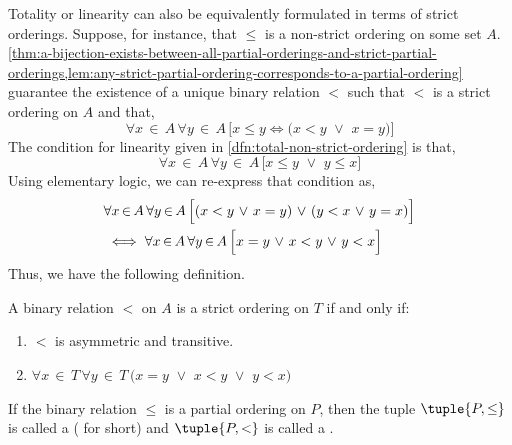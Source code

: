 \vspace{0.3cm}
\noindent
Totality or linearity can also be equivalently formulated in terms of strict orderings.
Suppose, for instance, that \( \leq \) is a non-strict ordering on some set \( A \).
\cref{thm:a-bijection-exists-between-all-partial-orderings-and-strict-partial-orderings,lem:any-strict-partial-ordering-corresponds-to-a-partial-ordering}
guarantee the existence of a unique binary relation \( < \) such that \( < \) is a strict ordering on \( A \) and that,
\begin{equation*}
    \forall x\,{\in}\,A \, \forall y\,{\in}\,A \, \Big[ x \leq y \iff \big( x < y \,\,{\lor}\,\, x = y \big) \Big]
\end{equation*}
The condition for linearity given in \cref{dfn:total-non-strict-ordering} is that,
\begin{equation*}
    \forall x\,{\in}\,A \, \forall y\,{\in}\,A \, \Big[ x \leq y \,\,{\lor}\,\, y \leq x \Big]
\end{equation*}
Using elementary logic, we can re-express that condition as,
\begin{align*}
    &\forall x\,{\in}\,A \, \forall y\,{\in}\,A \, \Big[ \mleft( x < y \,\,{\lor}\,\, x = y \mright) \,\,{\lor}\,\, \mleft( y < x \,\,{\lor}\,\, y = x \mright) \Big]\\
    &\iff
    \forall x\,{\in}\,A \, \forall y\,{\in}\,A \, \Big[ x = y \,\,{\lor}\,\, x < y \,\,{\lor}\,\, y < x \Big]
\end{align*}
Thus, we have the following definition.

\begin{dfn}
    \label{dfn:total-strict-ordering}
    A binary relation \( < \) on \( A \) is a  strict ordering on \( T \) if and only if:
    \begin{enumerate}[topsep=2pt,label=\texttt{\textup{(\alph*)}}]
        \item \( < \) is asymmetric and transitive.
        \item \( \forall x\,{\in}\,T \, \forall y\,{\in}\,T \, \big( x = y \,\,{\lor}\,\, x < y \,\,{\lor}\,\, y < x \big) \)
    \end{enumerate}
\end{dfn}

\begin{dfn}[Poset]
    \label{dfn:poset}
    If the binary relation \( \leq \) is a partial ordering on \( P \), then the tuple \( \tuple{P, \leq} \) is called a 
    ( for short) and \( \tuple{P, <} \) is called a .
\end{dfn}

